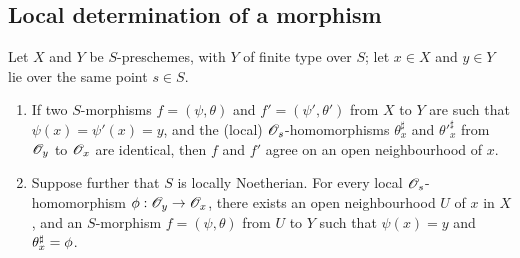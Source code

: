 \subsection{Local determination of a morphism}

\begin{prop}[6.5.1]
\label{1.6.5.1}
Let $X$ and $Y$ be $S$-preschemes, with $Y$ of finite type over $S$;
let $x\in X$ and $y\in Y$ lie over the same point $s\in S$.
\begin{enumerate}[label=\emph{(\roman*)}]
    \item If two $S$-morphisms $f=(\psi,\theta)$ and $f'=(\psi',\theta')$ from $X$ to $Y$ are such that $\psi(x)=\psi'(x)=y$, and the (local) $\mathscr{O}_s$-homomorphisms $\theta_x^\sharp$ and ${\theta'}_x^\sharp$ from $\mathscr{O}_y$ to $\mathscr{O}_x$ are identical, then $f$ and $f'$ agree on an open neighbourhood of $x$.
    \item Suppose further that $S$ is locally Noetherian.
        For every local $\mathscr{O}_s$-homomorphism $\vphi:\OO_y\to\OO_x$, there exists an open neighbourhood $U$ of $x$ in $X$, and an $S$-morphism $f=(\psi,\theta)$ from $U$ to $Y$ such that $\psi(x)=y$ and $\theta_x^\sharp=\phi$.
\end{enumerate}
\end{prop}


